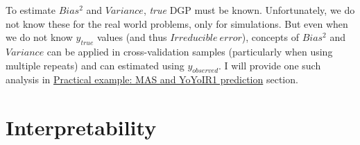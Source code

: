 \documentclass[
]{book}
\begin{document}
To estimate \(Bias^2\) and \(Variance\), \emph{true} DGP must be known. Unfortunately, we do not know these for the real world problems, only for simulations. But even when we do not know \(y_{true}\) values (and thus \(Irreducible \: error\)), concepts of \(Bias^2\) and \(Variance\) can be applied in cross-validation samples (particularly when using multiple repeats) and can estimated using \(y_{observed}\). I will provide one such analysis in \protect\hyperlink{practical-example-mas-and-yoyoir1-prediction}{Practical example: MAS and YoYoIR1 prediction} section.

\hypertarget{interpretability}{%
\section{Interpretability}\label{interpretability}}
\end{document}
